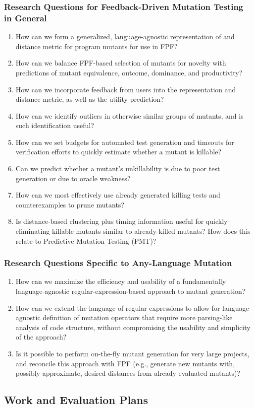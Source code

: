 \subsubsection{Research Questions for Feedback-Driven Mutation Testing
in General}

\begin{enumerate}
\item How can we form a generalized, language-agnostic representation
  of and distance metric for program mutants for use in FPF?
\item How can we balance FPF-based selection of mutants for novelty
  with predictions of mutant equivalence, outcome, dominance, and
  productivity?
\item How can we incorporate feedback from users into the 
  representation and distance metric, as well as the utility prediction? 
\item How can we identify outliers in otherwise similar groups of
  mutants, and is such identification useful?
\item How can we set budgets for automated test generation and
  timeouts for verification efforts to quickly estimate whether a
  mutant is killable?
\item Can we predict whether a mutant's unkillability is due to poor test 
  generation  or due to oracle weakness? 
\item How can we most effectively use already generated killing tests
  and counterexamples to prune mutants?
\item Is distance-based clustering plus timing information useful for quickly
  eliminating killable mutants similar to already-killed mutants?  How
  does this relate to Predictive Mutation Testing (PMT)?

\end{enumerate}

\subsubsection{Research Questions Specific to Any-Language Mutation}

\begin{enumerate}
\item How can we maximize the efficiency and usability of a
  fundamentally language-agnostic regular-expression-based approach to
  mutant generation?
\item How can we extend the language of regular expressions to allow
  for language-agnostic definition of mutation operators that require
  more parsing-like analysis of code structure, without compromising
  the usability and simplicity of the approach?
\item Is it possible to perform on-the-fly mutant generation for very
  large projects, and reconcile this approach with FPF (e.g., generate
  new mutants with, possibly approximate, desired distances from
  already evaluated mutants)?
\end{enumerate}

\subsection{Work and Evaluation Plans}
\label{sec:workplan}

